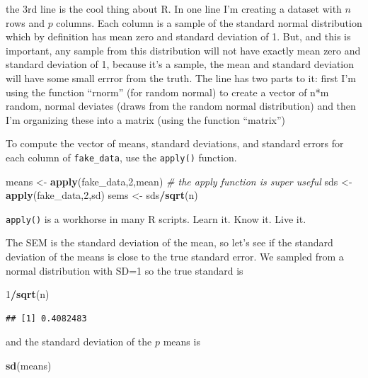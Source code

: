 \documentclass[]{book}
\newenvironment{Shaded}{\begin{snugshade}}{\end{snugshade}}
\newcommand{\KeywordTok}[1]{\textcolor[rgb]{0.13,0.29,0.53}{\textbf{#1}}}
\newcommand{\DecValTok}[1]{\textcolor[rgb]{0.00,0.00,0.81}{#1}}
\newcommand{\StringTok}[1]{\textcolor[rgb]{0.31,0.60,0.02}{#1}}
\newcommand{\CommentTok}[1]{\textcolor[rgb]{0.56,0.35,0.01}{\textit{#1}}}
\newcommand{\OperatorTok}[1]{\textcolor[rgb]{0.81,0.36,0.00}{\textbf{#1}}}
\newcommand{\NormalTok}[1]{#1}
\theoremstyle{definition}
\theoremstyle{definition}
\theoremstyle{definition}
\theoremstyle{remark}
\begin{document}
the 3rd line is the cool thing about R. In one line I'm creating a
dataset with \(n\) rows and \(p\) columns. Each column is a sample of
the standard normal distribution which by definition has mean zero and
standard deviation of 1. But, and this is important, any sample from
this distribution will not have exactly mean zero and standard deviation
of 1, because it's a sample, the mean and standard deviation will have
some small errror from the truth. The line has two parts to it: first
I'm using the function ``rnorm'' (for random normal) to create a vector
of n*m random, normal deviates (draws from the random normal
distribution) and then I'm organizing these into a matrix (using the
function ``matrix'')

To compute the vector of means, standard deviations, and standard errors
for each column of \texttt{fake\_data}, use the \texttt{apply()}
function.

\begin{Shaded}
\begin{Highlighting}[]
\NormalTok{means <-}\StringTok{ }\KeywordTok{apply}\NormalTok{(fake_data,}\DecValTok{2}\NormalTok{,mean) }\CommentTok{# the apply function is super useful}
\NormalTok{sds <-}\StringTok{ }\KeywordTok{apply}\NormalTok{(fake_data,}\DecValTok{2}\NormalTok{,sd)}
\NormalTok{sems <-}\StringTok{ }\NormalTok{sds}\OperatorTok{/}\KeywordTok{sqrt}\NormalTok{(n)}
\end{Highlighting}
\end{Shaded}

\texttt{apply()} is a workhorse in many R scripts. Learn it. Know it.
Live it.

The SEM is the standard deviation of the mean, so let's see if the
standard deviation of the means is close to the true standard error. We
sampled from a normal distribution with SD=1 so the true standard is

\begin{Shaded}
\begin{Highlighting}[]
\DecValTok{1}\OperatorTok{/}\KeywordTok{sqrt}\NormalTok{(n)}
\end{Highlighting}
\end{Shaded}

\begin{verbatim}
## [1] 0.4082483
\end{verbatim}

and the standard deviation of the \(p\) means is

\begin{Shaded}
\begin{Highlighting}[]
\KeywordTok{sd}\NormalTok{(means)}
\end{Highlighting}
\end{Shaded}
\end{document}
